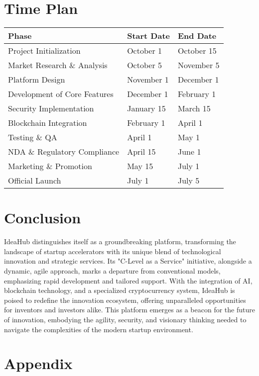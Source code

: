 \documentclass{article}
\begin{document}
	\section{Time Plan}
	\begin{tabularx}{\textwidth}{|X|X|X|}
		\hline
		\textbf{Phase} & \textbf{Start Date} & \textbf{End Date} \\
		\hline
		Project Initialization & October 1 & October 15 \\
		\hline
		Market Research \& Analysis & October 5 & November 5 \\
		\hline
		Platform Design & November 1 & December 1 \\
		\hline
		Development of Core Features & December 1 & February 1 \\
		\hline
		Security Implementation & January 15 & March 15 \\
		\hline
		Blockchain Integration & February 1 & April 1 \\
		\hline
		Testing \& QA & April 1 & May 1 \\
		\hline
		NDA \& Regulatory Compliance & April 15 & June 1 \\
		\hline
		Marketing \& Promotion & May 15 & July 1 \\
		\hline
		Official Launch & July 1 & July 5 \\
		\hline
	\end{tabularx}
	
	
	\section{Conclusion}
	IdeaHub distinguishes itself as a groundbreaking platform, transforming the landscape of startup accelerators with its unique blend of technological innovation and strategic services. Its "C-Level as a Service" initiative, alongside a dynamic, agile approach, marks a departure from conventional models, emphasizing rapid development and tailored support. With the integration of AI, blockchain technology, and a specialized cryptocurrency system, IdeaHub is poised to redefine the innovation ecosystem, offering unparalleled opportunities for inventors and investors alike. This platform emerges as a beacon for the future of innovation, embodying the agility, security, and visionary thinking needed to navigate the complexities of the modern startup environment.

	\newpage
	\appendix
	\section{Appendix}
\end{document}
